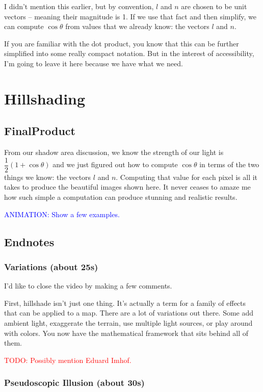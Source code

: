 \documentclass{article}
\newcommand\todo[1]{\textcolor{red}{TODO: #1}}
\newcommand\animation[1]{\textcolor{blue}{ANIMATION: #1}}
\begin{document}
I didn't mention this earlier, but by convention, $l$ and $n$ are chosen to be unit vectors -- meaning their magnitude is 1.
If we use that fact and then simplify, we can compute $\cos \theta$ from values that we already know: the vectors $l$ and $n$.

If you are familiar with the dot product, you know that this can be further simplified into some really compact notation.
But in the interest of accessibility, I'm going to leave it here because we have what we need.

\section{Hillshading}

\subsection{FinalProduct}

From our shadow area discussion, we know the strength of our light is $\dfrac{1}{2}(1 + \cos \theta)$ and we just figured out how to compute $\cos \theta$ in terms of the two things we know: the vectors $l$ and $n$.
Computing that value for each pixel is all it takes to produce the beautiful images shown here.
It never ceases to amaze me how such simple a computation can produce stunning and realistic results.

\animation{Show a few examples.}

\subsection{Endnotes}

\subsubsection{Variations (about 25s)}

I'd like to close the video by making a few comments.

First, hillshade isn't just one thing.
It's actually a term for a family of effects that can be applied to a map.
There are a lot of variations out there.
Some add ambient light, exaggerate the terrain, use multiple light sources, or play around with colors.
You now have the mathematical framework that sits behind all of them.

\todo{Possibly mention Eduard Imhof.}

\subsubsection{Pseudoscopic Illusion (about 30s)}
\end{document}
